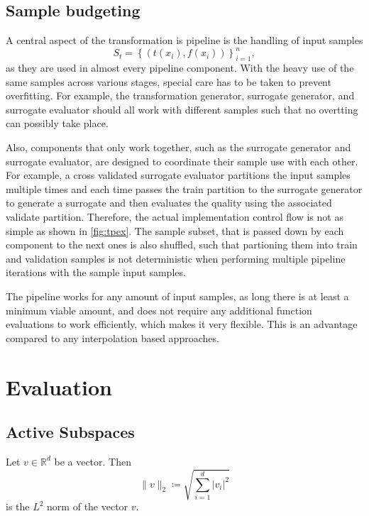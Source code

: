 \documentclass[
  a4paper,  %
  twoside,  %
  bibliography=totoc,
  headsepline,
  cleardoublepage=empty,
  parskip=half,
  draft=false
]{scrbook}
\begin{document}
\section{Sample budgeting}

A central aspect of the transformation is pipeline is the handling of input samples
\begin{equation}
S_t=\left\{(t(x_i), f(x_i))\right\}_{i=1}^n,
\nonumber
\end{equation}
as they are used in almost every pipeline component.
With the heavy use of the same samples across various stages, special care has to be taken to prevent overfitting.
For example, the transformation generator, surrogate generator, and surrogate evaluator should all work with different samples such that no overtting can possibly take place.

Also, components that only work together, such as the surrogate generator and surrogate evaluator, are designed to coordinate their sample use with each other.
For example, a cross validated surrogate evaluator partitions the input samples multiple times and each time passes the train partition to the surrogate generator to generate a surrogate and then evaluates the quality using the associated validate partition.
Therefore, the actual implementation control flow is not as simple as shown in \cref{fig:tpex}.
The sample subset, that is passed down by each component to the next ones is also shuffled, such that partioning them into train and validation samples is not deterministic when performing multiple pipeline iterations with the sample input samples.

The pipeline works for any amount of input samples, as long there is at least a minimum viable amount, and does not require any additional function evaluations to work efficiently, which makes it very flexible.
This is an advantage compared to any interpolation based approaches.

\chapter{Evaluation}
\label{chap:c7}

\section{Active Subspaces}


\begin{definition}[$L^2$ norm]
Let $v \in \mathds{R}^{d}$ be a vector. Then
\begin{equation}
\| v\|_2 \coloneqq \sqrt{\sum_{i=1}^d |v_{i}|^2}
\nonumber
\end{equation}
is the $L^2$ norm of the vector $v$.
\end{definition}
\end{document}
